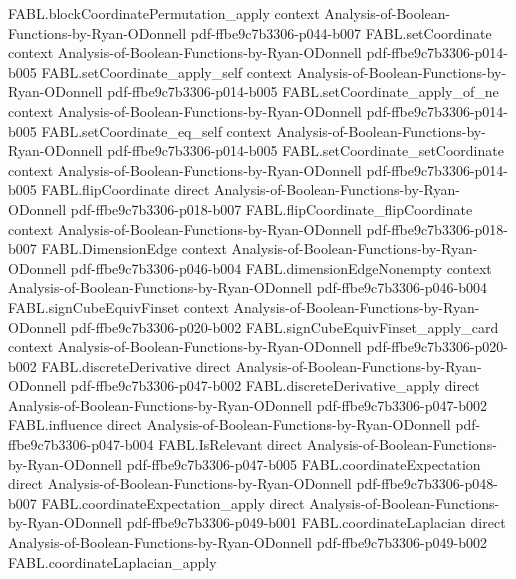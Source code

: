 \begin{theorem}
\proofstep
  {FABL.blockCoordinatePermutation_apply}
  {context}
  {Analysis-of-Boolean-Functions-by-Ryan-ODonnell}
  {pdf-ffbe9c7b3306-p044-b007}
\proofstep
  {FABL.setCoordinate}
  {context}
  {Analysis-of-Boolean-Functions-by-Ryan-ODonnell}
  {pdf-ffbe9c7b3306-p014-b005}
\proofstep
  {FABL.setCoordinate_apply_self}
  {context}
  {Analysis-of-Boolean-Functions-by-Ryan-ODonnell}
  {pdf-ffbe9c7b3306-p014-b005}
\proofstep
  {FABL.setCoordinate_apply_of_ne}
  {context}
  {Analysis-of-Boolean-Functions-by-Ryan-ODonnell}
  {pdf-ffbe9c7b3306-p014-b005}
\proofstep
  {FABL.setCoordinate_eq_self}
  {context}
  {Analysis-of-Boolean-Functions-by-Ryan-ODonnell}
  {pdf-ffbe9c7b3306-p014-b005}
\proofstep
  {FABL.setCoordinate_setCoordinate}
  {context}
  {Analysis-of-Boolean-Functions-by-Ryan-ODonnell}
  {pdf-ffbe9c7b3306-p014-b005}
\proofstep
  {FABL.flipCoordinate}
  {direct}
  {Analysis-of-Boolean-Functions-by-Ryan-ODonnell}
  {pdf-ffbe9c7b3306-p018-b007}
\proofstep
  {FABL.flipCoordinate_flipCoordinate}
  {context}
  {Analysis-of-Boolean-Functions-by-Ryan-ODonnell}
  {pdf-ffbe9c7b3306-p018-b007}
\proofstep
  {FABL.DimensionEdge}
  {context}
  {Analysis-of-Boolean-Functions-by-Ryan-ODonnell}
  {pdf-ffbe9c7b3306-p046-b004}
\proofstep
  {FABL.dimensionEdgeNonempty}
  {context}
  {Analysis-of-Boolean-Functions-by-Ryan-ODonnell}
  {pdf-ffbe9c7b3306-p046-b004}
\proofstep
  {FABL.signCubeEquivFinset}
  {context}
  {Analysis-of-Boolean-Functions-by-Ryan-ODonnell}
  {pdf-ffbe9c7b3306-p020-b002}
\proofstep
  {FABL.signCubeEquivFinset_apply_card}
  {context}
  {Analysis-of-Boolean-Functions-by-Ryan-ODonnell}
  {pdf-ffbe9c7b3306-p020-b002}
\proofstep
  {FABL.discreteDerivative}
  {direct}
  {Analysis-of-Boolean-Functions-by-Ryan-ODonnell}
  {pdf-ffbe9c7b3306-p047-b002}
\proofstep
  {FABL.discreteDerivative_apply}
  {direct}
  {Analysis-of-Boolean-Functions-by-Ryan-ODonnell}
  {pdf-ffbe9c7b3306-p047-b002}
\proofstep
  {FABL.influence}
  {direct}
  {Analysis-of-Boolean-Functions-by-Ryan-ODonnell}
  {pdf-ffbe9c7b3306-p047-b004}
\proofstep
  {FABL.IsRelevant}
  {direct}
  {Analysis-of-Boolean-Functions-by-Ryan-ODonnell}
  {pdf-ffbe9c7b3306-p047-b005}
\proofstep
  {FABL.coordinateExpectation}
  {direct}
  {Analysis-of-Boolean-Functions-by-Ryan-ODonnell}
  {pdf-ffbe9c7b3306-p048-b007}
\proofstep
  {FABL.coordinateExpectation_apply}
  {direct}
  {Analysis-of-Boolean-Functions-by-Ryan-ODonnell}
  {pdf-ffbe9c7b3306-p049-b001}
\proofstep
  {FABL.coordinateLaplacian}
  {direct}
  {Analysis-of-Boolean-Functions-by-Ryan-ODonnell}
  {pdf-ffbe9c7b3306-p049-b002}
\proofstep
  {FABL.coordinateLaplacian_apply}

\end{theorem}
